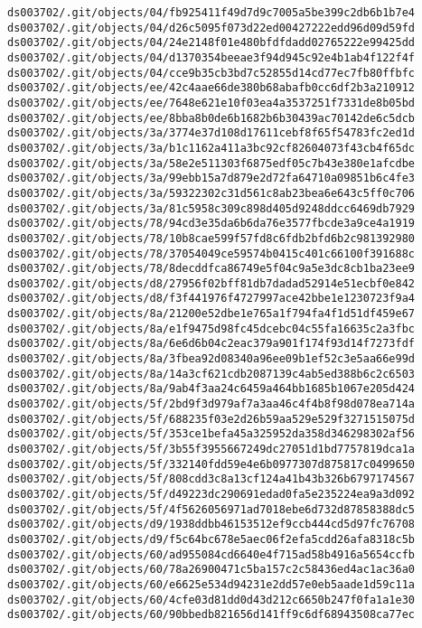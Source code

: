 \documentclass[11pt]{article}
\begin{document}
\begin{Verbatim}[commandchars=\\\{\}]
ds003702/.git/objects/04/fb925411f49d7d9c7005a5be399c2db6b1b7e4
ds003702/.git/objects/04/d26c5095f073d22ed00427222edd96d09d59fd
ds003702/.git/objects/04/24e2148f01e480bfdfdadd02765222e99425dd
ds003702/.git/objects/04/d1370354beeae3f94d945c92e4b1ab4f122f4f
ds003702/.git/objects/04/cce9b35cb3bd7c52855d14cd77ec7fb80ffbfc
ds003702/.git/objects/ee/42c4aae66de380b68abafb0cc6df2b3a210912
ds003702/.git/objects/ee/7648e621e10f03ea4a3537251f7331de8b05bd
ds003702/.git/objects/ee/8bba8b0de6b1682b6b30439ac70142de6c5dcb
ds003702/.git/objects/3a/3774e37d108d17611cebf8f65f54783fc2ed1d
ds003702/.git/objects/3a/b1c1162a411a3bc92cf82604073f43cb4f65dc
ds003702/.git/objects/3a/58e2e511303f6875edf05c7b43e380e1afcdbe
ds003702/.git/objects/3a/99ebb15a7d879e2d72fa64710a09851b6c4fe3
ds003702/.git/objects/3a/59322302c31d561c8ab23bea6e643c5ff0c706
ds003702/.git/objects/3a/81c5958c309c898d405d9248ddcc6469db7929
ds003702/.git/objects/78/94cd3e35da6b6da76e3577fbcde3a9ce4a1919
ds003702/.git/objects/78/10b8cae599f57fd8c6fdb2bfd6b2c981392980
ds003702/.git/objects/78/37054049ce59574b0415c401c66100f391688c
ds003702/.git/objects/78/8decddfca86749e5f04c9a5e3dc8cb1ba23ee9
ds003702/.git/objects/d8/27956f02bff81db7dadad52914e51ecbf0e842
ds003702/.git/objects/d8/f3f441976f4727997ace42bbe1e1230723f9a4
ds003702/.git/objects/8a/21200e52dbe1e765a1f794fa4f1d51df459e67
ds003702/.git/objects/8a/e1f9475d98fc45dcebc04c55fa16635c2a3fbc
ds003702/.git/objects/8a/6e6d6b04c2eac379a901f174f93d14f7273fdf
ds003702/.git/objects/8a/3fbea92d08340a96ee09b1ef52c3e5aa66e99d
ds003702/.git/objects/8a/14a3cf621cdb2087139c4ab5ed388b6c2c6503
ds003702/.git/objects/8a/9ab4f3aa24c6459a464bb1685b1067e205d424
ds003702/.git/objects/5f/2bd9f3d979af7a3aa46c4f4b8f98d078ea714a
ds003702/.git/objects/5f/688235f03e2d26b59aa529e529f3271515075d
ds003702/.git/objects/5f/353ce1befa45a325952da358d346298302af56
ds003702/.git/objects/5f/3b55f3955667249dc27051d1bd7757819dca1a
ds003702/.git/objects/5f/332140fdd59e4e6b0977307d875817c0499650
ds003702/.git/objects/5f/808cdd3c8a13cf124a41b43b326b6797174567
ds003702/.git/objects/5f/d49223dc290691edad0fa5e235224ea9a3d092
ds003702/.git/objects/5f/4f5626056971ad7018ebe6d732d87858388dc5
ds003702/.git/objects/d9/1938ddbb46153512ef9ccb444cd5d97fc76708
ds003702/.git/objects/d9/f5c64bc678e5aec06f2efa5cdd26afa8318c5b
ds003702/.git/objects/60/ad955084cd6640e4f715ad58b4916a5654ccfb
ds003702/.git/objects/60/78a26900471c5ba157c2c58436ed4ac1ac36a0
ds003702/.git/objects/60/e6625e534d94231e2dd57e0eb5aade1d59c11a
ds003702/.git/objects/60/4cfe03d81dd0d43d212c6650b247f0fa1a1e30
ds003702/.git/objects/60/90bbedb821656d141ff9c6df68943508ca77ec

\end{Verbatim}
\end{document}

